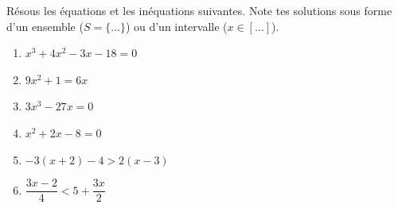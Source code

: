 %
%
    Résous les équations et les inéquations suivantes. Note tes solutions sous forme d'un ensemble (\(S = \{\dots\}\)) ou d'un intervalle (\(x \in [\dots]\)).
    \begin{enumerate}[cols=2]
        \item %
              $x^{3}+4x^{2}-3x -18=0$
        \item %
              $9x^{2}+1=6x$
        \item %
              $3x^{3}-27x=0$
        \item %
              $x^{2}+2x-8 =0$
        \item \(-3(x + 2)-4 > 2(x-3)\)
        \item \(\dfrac{3x-2}{4}<5 + \dfrac{3x}{2}\)
    \end{enumerate}
